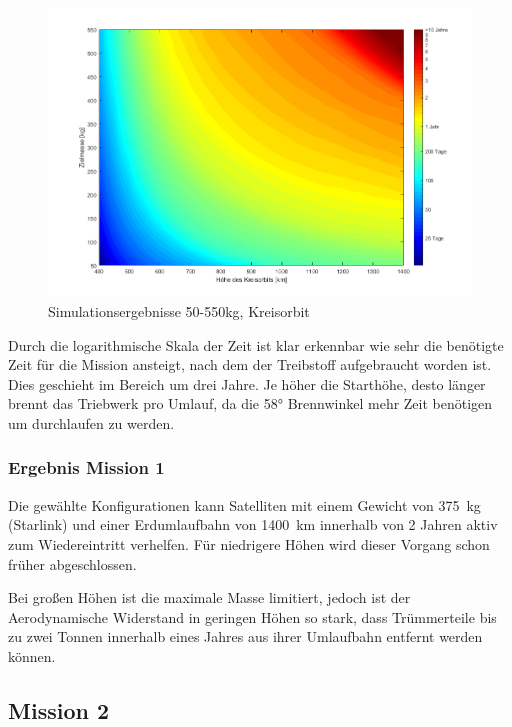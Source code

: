 \begin{figure}[h!]
	\centering
		\includegraphics[width=1.00\textwidth]{./graphics/GMAT/GMAT_Mass_over_Height_550.png}
		\caption{Simulationsergebnisse 50-550kg, Kreisorbit}
	\label{fig:GMAT_Mass_over_Height_550}
\end{figure}


	Durch die logarithmische Skala der Zeit ist klar erkennbar wie sehr die benötigte Zeit für die Mission ansteigt, nach dem der Treibstoff aufgebraucht worden ist. Dies geschieht im Bereich um drei Jahre. Je höher die Starthöhe, desto länger brennt das Triebwerk pro Umlauf, da die \num{58}° Brennwinkel mehr Zeit benötigen um durchlaufen zu werden. 

\subsubsection{Ergebnis Mission 1}

	Die gewählte Konfigurationen kann Satelliten mit einem Gewicht von \SI{375}{\kilogram} (Starlink) und einer Erdumlaufbahn von \SI{1400}{\kilo\metre} innerhalb von \num{2} Jahren  aktiv zum Wiedereintritt verhelfen. Für niedrigere Höhen wird dieser Vorgang schon früher abgeschlossen. 

	Bei großen Höhen ist die maximale Masse limitiert, jedoch ist der Aerodynamische Widerstand in geringen Höhen so stark, dass Trümmerteile bis zu zwei Tonnen innerhalb eines Jahres aus ihrer Umlaufbahn entfernt werden können. 

\subsection{Mission 2}

